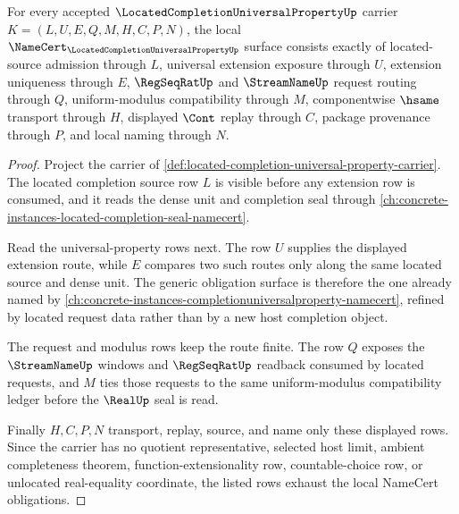 \begin{theorem}
\label{thm:located-completion-universal-property-namecert-obligations}
For every accepted $\LocatedCompletionUniversalPropertyUp$ carrier $K=(L,U,E,Q,M,H,C,P,N)$, the local $\NameCert_{\LocatedCompletionUniversalPropertyUp}$ surface consists exactly of located-source admission through $L$, universal extension exposure through $U$, extension uniqueness through $E$, $\RegSeqRatUp$ and $\StreamNameUp$ request routing through $Q$, uniform-modulus compatibility through $M$, componentwise $\hsame$ transport through $H$, displayed $\Cont$ replay through $C$, package provenance through $P$, and local naming through $N$.
\end{theorem}
\begin{proof}
Project the carrier of \autoref{def:located-completion-universal-property-carrier}. The located completion source row $L$ is visible before any extension row is consumed, and it reads the dense unit and completion seal through \autoref{ch:concrete-instances-located-completion-seal-namecert}.

Read the universal-property rows next. The row $U$ supplies the displayed extension route, while $E$ compares two such routes only along the same located source and dense unit. The generic obligation surface is therefore the one already named by \autoref{ch:concrete-instances-completionuniversalproperty-namecert}, refined by located request data rather than by a new host completion object.

The request and modulus rows keep the route finite. The row $Q$ exposes the $\StreamNameUp$ windows and $\RegSeqRatUp$ readback consumed by located requests, and $M$ ties those requests to the same uniform-modulus compatibility ledger before the $\RealUp$ seal is read.

Finally $H,C,P,N$ transport, replay, source, and name only these displayed rows. Since the carrier has no quotient representative, selected host limit, ambient completeness theorem, function-extensionality row, countable-choice row, or unlocated real-equality coordinate, the listed rows exhaust the local NameCert obligations.
\end{proof}


